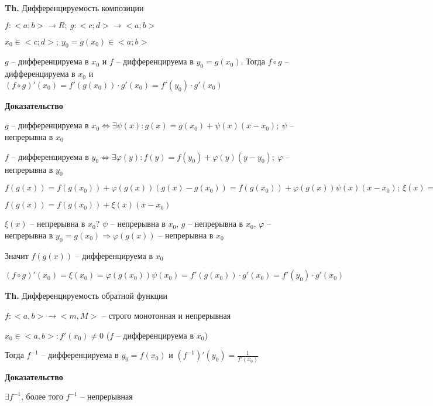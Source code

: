 \documentclass[14pt, letter paper]{article}
\begin{document}
\vspace{5mm}

\textbf{Th.} Дифференцируемость композиции

$f : <a;b> \rightarrow R;\ g : <c;d> \rightarrow <a;b>$

$x_0 \in <c;d>;\ y_0 = g(x_0) \in <a;b>$

$g$ -- дифференцируема в $x_0$ и $f$ -- дифференцируема в $y_0 = g(x_0)$. Тогда $f \circ g$ -- дифференцируема в $x_0$ и $(f \circ g)'(x_0) = f'(g(x_0)) \cdot g'(x_0) = f'(y_0) \cdot g'(x_0)$

\begin{center}
    \textbf{Доказательство}
\end{center}

$g$ -- дифференцируема в $x_0 \Leftrightarrow \exists \psi(x) : g(x) = g(x_0) + \psi(x)(x - x_0);\ \psi$ -- непрерывна в $x_0$

$f$ -- дифференцируема в $y_0 \Leftrightarrow \exists \varphi(y) : f(y) = f(y_0) + \varphi(y)(y - y_0);\ \varphi$ -- непрерывна в $y_0$

$f(g(x)) = f(g(x_0)) + \varphi(g(x))(g(x) - g(x_0)) = f(g(x_0)) + \varphi(g(x))\psi(x)(x - x_0);\ \xi(x) = \varphi(g(x))\psi(x)$

$f(g(x)) = f(g(x_0)) + \xi(x)(x - x_0)$

$\xi(x)$ -- непрерывна в $x_0$? $\psi$ -- непрерывна в $x_0$, $g$ -- непрерывна в $x_0$, $\varphi$ -- непрерывна в $y_0 = g(x_0) \Rightarrow \varphi(g(x))$ -- непрерывна в $x_0$

Значит $f(g(x))$ -- дифференцируема в $x_0$ 

$(f \circ g)'(x_0) = \xi(x_0) = \varphi(g(x_0))\psi(x_0) = f'(g(x_0)) \cdot g'(x_0) = f'(y_0) \cdot g'(x_0)$

\vspace{5mm}

\textbf{Th.} Дифференцируемость обратной функции

$f : <a, b> \rightarrow <m, M>$ -- строго монотонная и непрерывная

$x_0 \in <a, b> : f'(x_0) \neq 0$ ($f$ -- дифференцируема в $x_0$)

Тогда $f^{-1}$ -- дифференцируема в $y_0 = f(x_0)$ и $(f^{-1})'(y_0) = \frac{1}{f'(x_0)}$

\begin{center}
    \textbf{Доказательство}
\end{center}

$\exists f^{-1}$, более того $f^{-1}$ -- непрерывная
\end{document}

